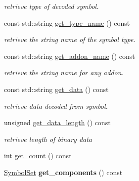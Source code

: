 \begin{DoxyCompactItemize}
\begin{DoxyCompactList}\small\item\em retrieve type of decoded symbol. \end{DoxyCompactList}\item 
\hypertarget{classzbar_1_1_symbol_a516394eb003a5140f3915759c4843ca5}{
const std::string \hyperlink{classzbar_1_1_symbol_a516394eb003a5140f3915759c4843ca5}{get\_\-type\_\-name} () const }
\label{classzbar_1_1_symbol_a516394eb003a5140f3915759c4843ca5}

\begin{DoxyCompactList}\small\item\em retrieve the string name of the symbol type. \end{DoxyCompactList}\item 
\hypertarget{classzbar_1_1_symbol_a0c9d2af65d1c7bcc45ffaa136904ddb6}{
const std::string \hyperlink{classzbar_1_1_symbol_a0c9d2af65d1c7bcc45ffaa136904ddb6}{get\_\-addon\_\-name} () const }
\label{classzbar_1_1_symbol_a0c9d2af65d1c7bcc45ffaa136904ddb6}

\begin{DoxyCompactList}\small\item\em retrieve the string name for any addon. \end{DoxyCompactList}\item 
\hypertarget{classzbar_1_1_symbol_a75b812204cbba43003174e38ca3455f0}{
const std::string \hyperlink{classzbar_1_1_symbol_a75b812204cbba43003174e38ca3455f0}{get\_\-data} () const }
\label{classzbar_1_1_symbol_a75b812204cbba43003174e38ca3455f0}

\begin{DoxyCompactList}\small\item\em retrieve data decoded from symbol. \end{DoxyCompactList}\item 
\hypertarget{classzbar_1_1_symbol_a5ef806f9c42a93c66ed417b92b992751}{
unsigned \hyperlink{classzbar_1_1_symbol_a5ef806f9c42a93c66ed417b92b992751}{get\_\-data\_\-length} () const }
\label{classzbar_1_1_symbol_a5ef806f9c42a93c66ed417b92b992751}

\begin{DoxyCompactList}\small\item\em retrieve length of binary data \end{DoxyCompactList}\item 
int \hyperlink{classzbar_1_1_symbol_a99e1930be6a4bf9de96b1b97ae198935}{get\_\-count} () const 
\item 
\hypertarget{classzbar_1_1_symbol_a369b846afa41449dbbc966ab6691b901}{
\hyperlink{classzbar_1_1_symbol_set}{SymbolSet} {\bfseries get\_\-components} () const }
\label{classzbar_1_1_symbol_a369b846afa41449dbbc966ab6691b901}


\end{DoxyCompactItemize}
